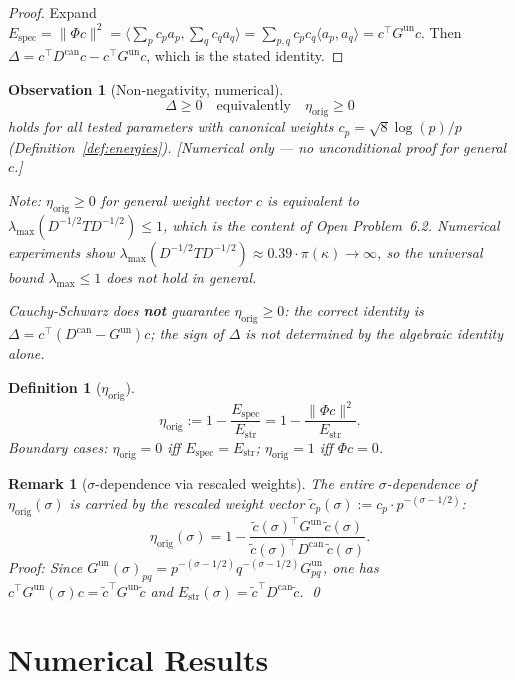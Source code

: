 \documentclass[11pt]{article}
\newtheorem{definition}[theorem]{Definition}
\newtheorem{observation}[theorem]{Observation}
\newtheorem*{remark}{Remark}
\newcommand{\Estr}{E_{\mathrm{str}}}
\newcommand{\Espec}{E_{\mathrm{spec}}}
\newcommand{\etaorig}{\eta_{\mathrm{orig}}}
\newcommand{\Gun}{G^{\mathrm{un}}}
\newcommand{\Dcan}{D^{\mathrm{can}}}
\begin{document}
\begin{proof}
Expand $\Espec=\|\Phi c\|^2=\bigl\langle\sum_p c_p a_p,\sum_q c_q
a_q\bigr\rangle=\sum_{p,q}c_p c_q\langle a_p,a_q\rangle=c^\top\Gun c$.
Then $\Delta=c^\top\Dcan c-c^\top\Gun c$, which is the stated identity.
\end{proof}

\begin{observation}[Non-negativity, numerical]
\label{obs:nonneg}
\[
\Delta\geq 0\quad\text{equivalently}\quad\etaorig\geq 0
\]
holds for all tested parameters with canonical weights
$c_p=\sqrt{8}\log(p)/p$ (Definition~\ref{def:energies}).
\emph{[Numerical only --- no unconditional proof for general $c$.]}

Note: $\etaorig\geq 0$ for general weight vector $c$ is equivalent to
$\lambda_{\max}(D^{-1/2}TD^{-1/2})\leq 1$, which is the content of
Open Problem~6.2. Numerical experiments show
$\lambda_{\max}(D^{-1/2}TD^{-1/2})\approx 0.39\cdot\pi(\kappa)\to\infty$,
so the universal bound $\lambda_{\max}\leq 1$ does not hold in general.

\emph{Cauchy-Schwarz does \textbf{not} guarantee $\etaorig\geq 0$}: the
correct identity is $\Delta=c^\top(\Dcan-\Gun)c$; the sign of $\Delta$ is not
determined by the algebraic identity alone.
\end{observation}

\begin{definition}[$\etaorig$]
\label{def:eta}
\[
\etaorig:=1-\frac{\Espec}{\Estr}=1-\frac{\|\Phi c\|^2}{\Estr}.
\]
Boundary cases: $\etaorig=0$ iff $\Espec=\Estr$; $\etaorig=1$ iff $\Phi c=0$.
\end{definition}

\begin{remark}[$\sigma$-dependence via rescaled weights]
The entire $\sigma$-dependence of $\etaorig(\sigma)$ is carried by the
rescaled weight vector $\tilde{c}_p(\sigma):=c_p\cdot p^{-(\sigma-1/2)}$:
\[
\etaorig(\sigma)=1-\frac{\tilde{c}(\sigma)^\top\Gun\,\tilde{c}(\sigma)}
{\tilde{c}(\sigma)^\top\Dcan\,\tilde{c}(\sigma)}.
\]
\emph{Proof:} Since $\Gun(\sigma)_{pq}=p^{-(\sigma-1/2)}q^{-(\sigma-1/2)}\Gun_{pq}$,
one has $c^\top\Gun(\sigma)c=\tilde{c}^\top\Gun\tilde{c}$ and
$\Estr(\sigma)=\tilde{c}^\top\Dcan\tilde{c}$. \qed
\end{remark}

\section{Numerical Results}
\end{document}
